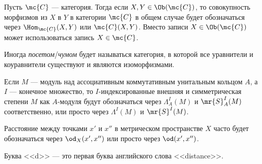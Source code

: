 \documentclass[
	extrafontsizes,
	11pt,
	hyphens,
]{memoir}
\begin{document}
\begin{notation}
Пусть \(\mc{C}\) --- категория. Тогда если \(X,Y \in \Ob(\mc{C})\), то совокупность морфизмов из \(X\) в \(Y\) в категории \(\mc{C}\) в общем случае будет обозначаться через \(\Hom_{\mc{C}}(X,Y)\) или \(\mc{C}(X,Y)\).
Вместо записи \(X \in \Ob(\mc{C})\) может использоваться запись \(X \in \mc{C}\).
\end{notation}


\begin{convention}
Иногда \emph{посетом}/\emph{чумом} будет называться категория, в которой все уравнители и коуравнители существуют и являются изоморфизмами.
\end{convention}

\begin{notation}
Если \(M\) --- модуль над ассоциативным коммутативным унитальным кольцом \(A\), а \(I\) --- конечное множество, то \(I\)-индексированные внешняя и симметрическая степени \(M\) как \(A\)-модуля будут обозначаться через \(\Lambda^I_A(M)\) и \(\mr{S}^I_A(M)\) соответственно, или просто через \(\Lambda^I(M)\) и \(\mr{S}^I(M)\).
\end{notation}

\begin{notation}
Расстояние между точками \(x'\) и \(x''\) в метрическом пространстве \(X\) часто будет обозначаться через \(\od_X(x',x'')\) или просто через \(\od(x',x'')\).
\end{notation}

\begin{remark}
Буква <<\textenglish{d}>> ---  это первая буква английского слова <<\textenglish{distance}>>.
\end{remark}

\end{document}
